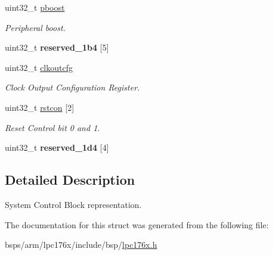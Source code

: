 \begin{DoxyCompactItemize}
uint32\+\_\+t \mbox{\hyperlink{structlpc176x__scb_a4806a2f3f8ca143d7bcb482cb34bac23}{pboost}}
\begin{DoxyCompactList}\small\item\em Peripheral boost. \end{DoxyCompactList}\item 
\mbox{\label{structlpc176x__scb_adb69421a42a5296962244f3d9bed209b}} 
uint32\+\_\+t {\bfseries reserved\+\_\+1b4} \mbox{[}5\mbox{]}
\item 
\mbox{\label{structlpc176x__scb_a621d78bd4ff6eccb254d329240a48b42}} 
uint32\+\_\+t \mbox{\hyperlink{structlpc176x__scb_a621d78bd4ff6eccb254d329240a48b42}{clkoutcfg}}
\begin{DoxyCompactList}\small\item\em Clock Output Configuration Register. \end{DoxyCompactList}\item 
\mbox{\label{structlpc176x__scb_ab57e180a2fa10393803b96f96833e3ea}} 
uint32\+\_\+t \mbox{\hyperlink{structlpc176x__scb_ab57e180a2fa10393803b96f96833e3ea}{rstcon}} \mbox{[}2\mbox{]}
\begin{DoxyCompactList}\small\item\em Reset Control bit 0 and 1. \end{DoxyCompactList}\item 
\mbox{\label{structlpc176x__scb_aca2be84b2878e5764ee8dab5c289701c}} 
uint32\+\_\+t {\bfseries reserved\+\_\+1d4} \mbox{[}4\mbox{]}
\end{DoxyCompactItemize}


\subsection{Detailed Description}
System Control Block representation. 

The documentation for this struct was generated from the following file\+:\begin{DoxyCompactItemize}
\item 
bsps/arm/lpc176x/include/bsp/\mbox{\hyperlink{lpc176x_8h}{lpc176x.\+h}}\end{DoxyCompactItemize}
